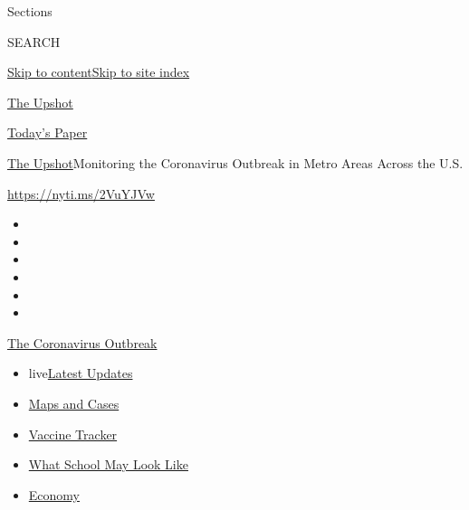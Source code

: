Sections

SEARCH

\protect\hyperlink{site-content}{Skip to
content}\protect\hyperlink{site-index}{Skip to site index}

\href{https://www.nytimes.com/section/upshot}{The Upshot}

\href{https://myaccount.nytimes.com/auth/login?response_type=cookie\&client_id=vi}{}

\href{https://www.nytimes.com/section/todayspaper}{Today's Paper}

\href{/section/upshot}{The Upshot}\textbar{}Monitoring the Coronavirus
Outbreak in Metro Areas Across the U.S.

\url{https://nyti.ms/2VuYJVw}

\begin{itemize}
\item
\item
\item
\item
\item
\item
\end{itemize}

\href{https://www.nytimes.com/news-event/coronavirus?action=click\&pgtype=Article\&state=default\&region=TOP_BANNER\&context=storylines_menu}{The
Coronavirus Outbreak}

\begin{itemize}
\tightlist
\item
  live\href{https://www.nytimes.com/2020/08/02/world/coronavirus-updates.html?action=click\&pgtype=Article\&state=default\&region=TOP_BANNER\&context=storylines_menu}{Latest
  Updates}
\item
  \href{https://www.nytimes.com/interactive/2020/us/coronavirus-us-cases.html?action=click\&pgtype=Article\&state=default\&region=TOP_BANNER\&context=storylines_menu}{Maps
  and Cases}
\item
  \href{https://www.nytimes.com/interactive/2020/science/coronavirus-vaccine-tracker.html?action=click\&pgtype=Article\&state=default\&region=TOP_BANNER\&context=storylines_menu}{Vaccine
  Tracker}
\item
  \href{https://www.nytimes.com/interactive/2020/07/29/us/schools-reopening-coronavirus.html?action=click\&pgtype=Article\&state=default\&region=TOP_BANNER\&context=storylines_menu}{What
  School May Look Like}
\item
  \href{https://www.nytimes.com/live/2020/07/31/business/stock-market-today-coronavirus?action=click\&pgtype=Article\&state=default\&region=TOP_BANNER\&context=storylines_menu}{Economy}
\end{itemize}

